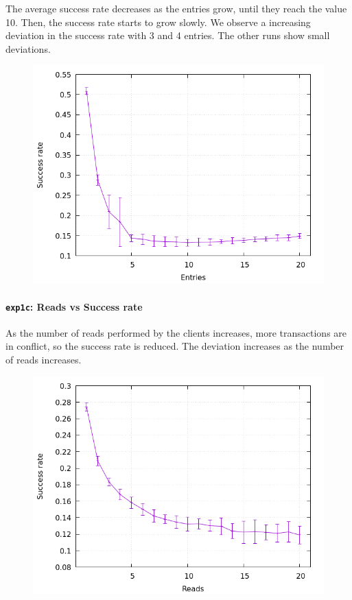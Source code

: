 \documentclass[a4paper, 11pt]{article}
\begin{document}
The average success rate decreases as the entries grow, until they reach the 
value 10. Then, the success rate starts to grow slowly. We observe a increasing 
deviation in the success rate with 3 and 4 entries. The other runs show small 
deviations.
\nopagebreak
\begin{figure}[H]
\centering
\includegraphics[width=.8\linewidth]{exp1/b/fig.png}
\end{figure}

\paragraph{\texttt{exp1c}: Reads vs Success rate}

As the number of reads performed by the clients increases, more transactions are 
in conflict, so the success rate is reduced. The deviation increases as the 
number of reads increases.
\nopagebreak
\begin{figure}[H]
\centering
\includegraphics[width=.8\linewidth]{exp1/c/fig.png}
\end{figure}
\end{document}
